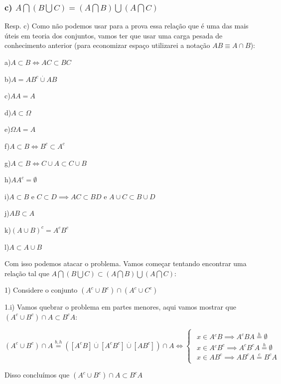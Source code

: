 \documentclass[portuguese]{article}
\begin{document}
\subsubsection*{\textmd{c) $A\bigcap(B\bigcup C)=(A\bigcap B)\bigcup(A\bigcap C)$}}

Resp. c) Como não podemos usar para a prova essa relação que é uma
das mais úteis em teoria dos conjuntos, vamos ter que usar uma carga
pesada de conhecimento anterior (para economizar espaço utilizarei
a notação $AB\equiv A\cap B$):

a)$A\subset B\Longleftrightarrow AC\subset BC$

b)$A=AB^{c}\overset{.}{\cup}AB$

c)$AA=A$

d)$A\subset\Omega$

e)$\Omega A=A$

f)$A\subset B\Longleftrightarrow B^{c}\subset A^{c}$

g)$A\subset B\Longleftrightarrow C\cup A\subset C\cup B$

h)$AA^{c}=\emptyset$

i)$A\subset B$ e $C\subset D\implies AC\subset BD$ e $A\cup C\subset B\cup D$

j)$AB\subset A$

k)$(A\cup B)^{c}=A^{c}B^{c}$

l)$A\subset A\cup B$

Com isso podemos atacar o problema. Vamos começar tentando encontrar
uma relação tal que $A\bigcap(B\bigcup C)\subset(A\bigcap B)\bigcup(A\bigcap C)$:

1) Considere o conjunto $(A^{c}\cup B^{c})\cap(A^{c}\cup C^{c})$

1.i) Vamos quebrar o problema em partes menores, aqui vamos mostrar
que $(A^{c}\cup B^{c})\cap A\subset B^{c}A$:

$(A^{c}\cup B^{c})\cap A\overset{b,h}{=}([A^{c}B]\overset{.}{\cup}[A^{c}B^{c}]\overset{.}{\cup}[AB^{c}])\cap A\Longleftrightarrow\begin{cases}
\begin{array}{c}
x\in A{}^{c}B\implies A^{c}BA\overset{h}{=}\emptyset\\
x\in A{}^{c}B^{c}\implies A^{c}B^{c}A\overset{h}{=}\emptyset\\
x\in AB^{c}\implies AB^{c}A\overset{c}{=}B^{c}A
\end{array}\end{cases}$

Disso concluímos que $(A^{c}\cup B^{c})\cap A\subset B^{c}A$
\end{document}
